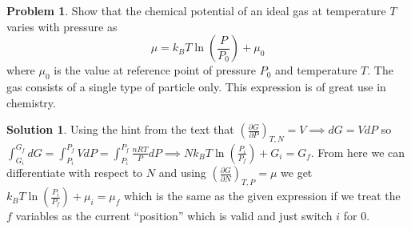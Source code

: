 \documentclass[10pt]{article}
\theoremstyle{definition}
\newtheorem{problem}{Problem}
\newtheorem{soln}{Solution}
\begin{document}
\begin{problem}
Show that the chemical potential of an ideal gas at temperature $T$ varies with pressure as
$$\mu=k_B T\ln\left(\frac{P}{P_0}\right)+\mu_0$$
where $\mu_0$ is the value at reference point of pressure $P_0$ and temperature $T$. The gas consists of a single type of particle only.
This expression is of great use in chemistry.
\end{problem}
\begin{soln}
  Using the hint from the text that $\left(\frac{\partial G}{\partial P}\right)_{T,N}=V\implies dG=VdP$ so $\int_{G_i}^{G_f}dG=\int_{P_i}^{P_f}VdP
    =\int_{P_i}^{P_f}\frac{nRT}{P}dP\implies Nk_BT\ln\left(\frac{P_i}{P_f}\right)+G_i=G_f$. From here we can differentiate with respect to $N$ and
  using $\left(\frac{\partial G}{\partial N}\right)_{T,P}=\mu$ we get $k_BT\ln\left(\frac{P_i}{P_f}\right)+\mu_i=\mu_f$ which is the same as the given expression
  if we treat the $f$ variables as the current ``position'' which is valid and just switch $i$ for $0$.
\end{soln}
\end{document}
